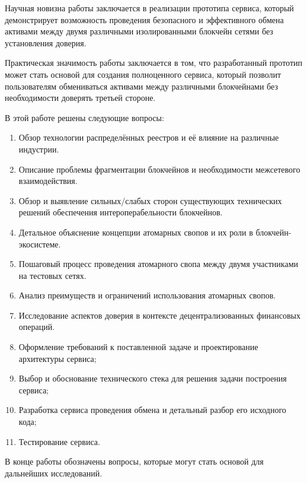 Научная новизна работы заключается в реализации прототипа сервиса, который демонстрирует возможность проведения безопасного и эффективного обмена активами между двумя различными изолированными блокчейн сетями без установления доверия.

Практическая значимость работы заключается в том, что разработанный прототип может стать основой для создания полноценного сервиса, который позволит пользователям обмениваться активами между различными блокчейнами без необходимости доверять третьей стороне.

В этой работе решены следующие вопросы:
\begin{enumerate}
\item Обзор технологии распределённых реестров и её влияние на различные индустрии.
\item Описание проблемы фрагментации блокчейнов и необходимости межсетевого взаимодействия.
\item Обзор и выявление сильных/слабых сторон существующих технических решений обеспечения интероперабельности блокчейнов.
\item Детальное объяснение концепции атомарных свопов и их роли в блокчейн-экосистеме.
\item Пошаговый процесс проведения атомарного свопа между двумя участниками на тестовых сетях.
\item Анализ преимуществ и ограничений использования атомарных свопов.
\item Исследование аспектов доверия в контексте децентрализованных финансовых операций.
\item Оформление требований к поставленной задаче и проектирование архитектуры сервиса;
\item Выбор и обоснование технического стека для решения задачи построения сервиса;
\item Разработка сервиса проведения обмена и детальный разбор его исходного кода;
\item Тестирование сервиса.
\end{enumerate}

В конце работы обозначены вопросы, которые могут стать основой для дальнейших исследований.